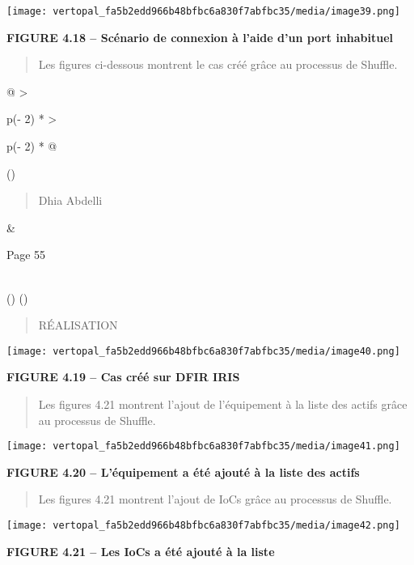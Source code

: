 \documentclass[
]{article}
\begin{document}
\texttt{[image: vertopal\_fa5b2edd966b48bfbc6a830f7abfbc35/media/image39.png]}

\textbf{FIGURE 4.18 -- Scénario de connexion à l'aide d'un port
inhabituel}

\begin{quote}
Les figures ci-dessous montrent le cas créé grâce au processus de
Shuffle.
\end{quote}

\begin{longtable}[]{@{}
  >{\raggedright\arraybackslash}p{(\columnwidth - 2\tabcolsep) * }
  >{\raggedright\arraybackslash}p{(\columnwidth - 2\tabcolsep) * }@{}}
\toprule()
\begin{minipage}[b]{\linewidth}\raggedright
\begin{quote}
Dhia Abdelli
\end{quote}
\end{minipage} & \begin{minipage}[b]{\linewidth}\raggedright
Page 55
\end{minipage} \\
\midrule()
\endhead
\bottomrule()
\end{longtable}

\begin{quote}
RÉALISATION
\end{quote}

\texttt{[image: vertopal\_fa5b2edd966b48bfbc6a830f7abfbc35/media/image40.png]}

\textbf{FIGURE 4.19 -- Cas créé sur DFIR IRIS}

\begin{quote}
Les figures 4.21 montrent l'ajout de l'équipement à la liste des actifs
grâce au processus de Shuffle.
\end{quote}

\texttt{[image: vertopal\_fa5b2edd966b48bfbc6a830f7abfbc35/media/image41.png]}

\textbf{FIGURE 4.20 -- L'équipement a été ajouté à la liste des actifs}

\begin{quote}
Les figures 4.21 montrent l'ajout de IoCs grâce au processus de Shuffle.
\end{quote}

\texttt{[image: vertopal\_fa5b2edd966b48bfbc6a830f7abfbc35/media/image42.png]}

\textbf{FIGURE 4.21 -- Les IoCs a été ajouté à la liste}
\end{document}
